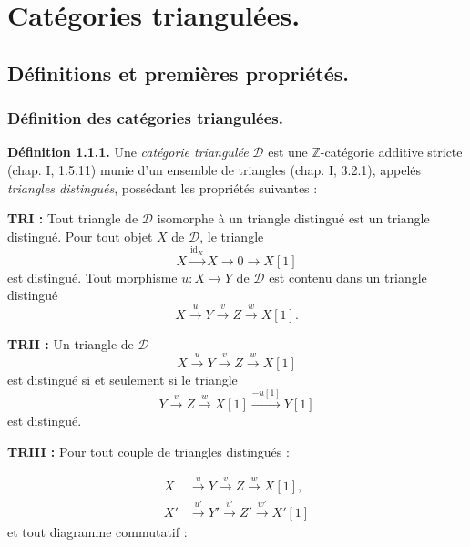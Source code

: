 \chapter{Catégories triangulées.}
%
\begingroup
\small
\setlength{\abovedisplayskip}{4pt plus 2pt minus 2pt}%
\setlength{\belowdisplayskip}{4pt plus 2pt minus 2pt}%

\section{Définitions et premières propriétés.}

\subsection{Définition des catégories triangulées.}

\noindent\textbf{Définition 1.1.1.}\quad
Une \emph{catégorie triangulée} $\mathcal D$ est une $\mathbb Z$-catégorie
additive stricte (chap. I, 1.5.11) munie d'un ensemble de triangles
(chap. I, 3.2.1), appelés \emph{triangles distingués}, possédant les
propriétés suivantes :

\smallskip
\noindent\textbf{TRI :}
Tout triangle de $\mathcal D$ isomorphe à un triangle distingué est un
triangle distingué. Pour tout objet $X$ de $\mathcal D$, le triangle
\[
  X\xrightarrow{\operatorname{id}_X}X\longrightarrow 0
  \longrightarrow X[1]
\]
est distingué. Tout morphisme $u\colon X\longrightarrow Y$ de $\mathcal D$
est contenu dans un triangle distingué
\[
  X\xrightarrow{u}Y\xrightarrow{v}Z\xrightarrow{w}X[1].
\]

\noindent\textbf{TRII :}
Un triangle de $\mathcal D$
\[
  X\xrightarrow{u}Y\xrightarrow{v}Z\xrightarrow{w}X[1]
\]
est distingué si et seulement si le triangle
\[
  Y\xrightarrow{v}Z\xrightarrow{w}X[1]
  \xrightarrow{-u[1]}Y[1]
\]
est distingué.

\noindent\textbf{TRIII :}
Pour tout couple de triangles distingués :

\[
  \begin{aligned}
    X  &\xrightarrow{u}  Y  \xrightarrow{v}  Z  \xrightarrow{w}  X[1],\\
    X' &\xrightarrow{u'} Y' \xrightarrow{v'} Z' \xrightarrow{w'} X'[1]
  \end{aligned}
\]
et tout diagramme commutatif :

\begin{center}
\end{center}
\endgroup
